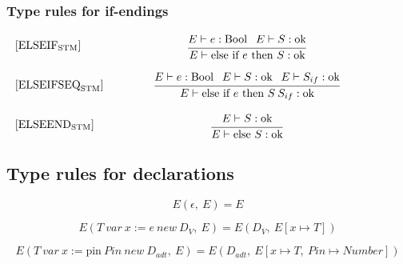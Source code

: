 \subsubsection*{Type rules for if-endings}
\begin{equation}
\begin{minipage}{.2\linewidth}
$[\text{ELSEIF}_\text{STM}]$
\end{minipage}
\begin{minipage}{.8\linewidth}
\centering
$\cfrac{E \vdash e : \text{Bool } \: \: E \vdash S : \text{ok}}{E \vdash \text{else if } e \text{ then } S : \text{ok}}$
\end{minipage}
\end{equation}

\begin{equation}
\begin{minipage}{.2\linewidth}
$[\text{ELSEIFSEQ}_\text{STM}]$
\end{minipage}
\begin{minipage}{.8\linewidth}
\centering
$\cfrac{E \vdash e : \text{Bool } \: \: E \vdash S : \text{ok } \: \: E \vdash S_{if} : \text{ok}}{E \vdash \text{else if } e \text{ then } S \: S_{if} : \text{ok}}$
\end{minipage}
\end{equation}

\begin{equation}
\begin{minipage}{.2\linewidth}
$[\text{ELSEEND}_\text{STM}]$
\end{minipage}
\begin{minipage}{.8\linewidth}
\centering
$\cfrac{E \vdash S : \text{ok}}{E \vdash \text{else } S : \text{ok}}$
\end{minipage}
\end{equation}


\subsection{Type rules for declarations}

\begin{equation}\label{app:typehelp1}
    E(\epsilon, \: E) = E
\end{equation}

\begin{equation}\label{app:typehelp2}
    E(T \: var \: x := e \: new \: D_V, \: E) = E(D_V, \: E[x \mapsto T])
\end{equation}

\begin{equation}\label{app:typehelpADT}
    E(T \: var \: x := \text{pin} \: Pin \: new \: D_{adt}, \: E) = E(D_{adt}, \: E[x \mapsto T, \: Pin \mapsto Number])
\end{equation}

